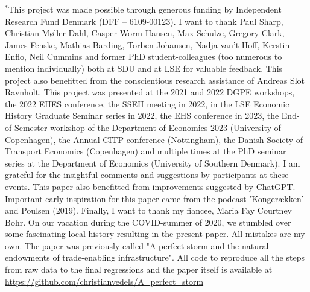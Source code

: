 \documentclass[11pt]{article}
\begin{document}
\begin{titlepage}
    \footnotesize
    $^*$This project was made possible through generous funding by Independent Research Fund Denmark (DFF – 6109-00123). I want to thank Paul Sharp, Christian Møller-Dahl, Casper Worm Hansen, Max Schulze, Gregory Clark, James Fenske, Mathias Barding, Torben Johansen, Nadja van't Hoff, Kerstin Enflo, Neil Cummins and former PhD student-colleagues (too numerous to mention individually) both at SDU and at LSE for valuable feedback. This project also benefitted from the conscientious research assistance of Andreas Slot Ravnholt. This project was presented at the 2021 and 2022 DGPE workshops, the 2022 EHES conference, the SSEH meeting in 2022, in the LSE Economic History Graduate Seminar series in 2022, the EHS conference in 2023, the End-of-Semester workshop of the Department of Economics 2023 (University of Copenhagen), the Annual CITP conference (Nottingham), the Danish Society of Transport Economics (Copenhagen) and multiple times at the PhD seminar series at the Department of Economics (University of Southern Denmark). I am grateful for the insightful comments and suggestions by participants at these events. This paper also benefitted from improvements suggested by ChatGPT. Important early inspiration for this paper came from the podcast 'Kongerækken' and Poulsen (2019). Finally, I want to thank my fiancee, Maria Fay Courtney Bohr. On our vacation during the COVID-summer of 2020, we stumbled over some fascinating local history resulting in the present paper.  All mistakes are my own. The paper was previously called "A perfect storm and the natural endowments of trade-enabling infrastructure". All code to reproduce all the steps from raw data to the final regressions and the paper itself is available at \\ \url{https://github.com/christianvedels/A_perfect_storm}

\end{titlepage}
\newpage
\end{document}
